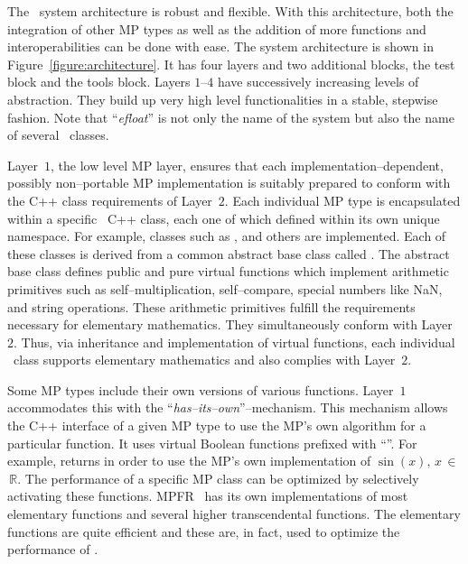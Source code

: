 The \efloat\ system architecture is robust and flexible.
With this architecture, both the integration of other MP types as well as
the addition of more functions and interoperabilities can be done with ease. 
The system architecture is shown in Figure~\ref{figure:architecture}.
It has four layers and two additional
blocks, the test block and the tools block. Layers $1$--$4$ have successively
increasing levels of abstraction. They build up very high level
functionalities in a stable, stepwise fashion.
Note that ``{\emph e}{\ttfamily{\underline\ }}{\emph{float}}''
is not only the name of the system but also the name of several
\efloatclass\ classes.

Layer~$1$, the low level MP layer, ensures that each
implementation--dependent, possibly non--portable MP implementation
is suitably prepared to conform with the C++ class requirements of Layer~$2$.
Each individual MP type is encapsulated within a specific
\efloatclass\ C++ class,
each one of which defined within its own unique name\-space.
For example, classes such as
{},
{} and others are implemented.
Each of these classes is derived from a common abstract
base class called {}.
The abstract base class defines public and pure virtual functions
which implement arithmetic primitives such as self--multiplication,
self--compare, special numbers like NaN, and string operations.
These arithmetic primitives fulfill the requirements necessary for
elementary mathematics. They simultaneously conform with Layer~$2$.
Thus, via inheritance and implementation of virtual functions,
each individual \efloatclass\
class supports elementary mathematics and also complies with Layer~$2$.

Some MP types include their own versions of various functions.
Layer~$1$ accommodates this with the
``{\emph{has--its--own}}''--mechanism. This mechanism allows the
C++ interface of a given MP type to use the MP's own
algorithm for a particular function.
It uses virtual Boolean functions prefixed with
``{}''.
For example,
{}
returns {\courier{true}} in order to use the MP's own implementation
of $\sin(x)$, $x$$\,\in$$\,\mathbb{R}$.
The performance of a specific MP class can be optimized
by selectively activating these functions.
MPFR~\cite{33:2:1} has its own implementations of most elementary functions
and several higher transcendental functions. The elementary functions
are quite efficient and these are, in fact, used to optimize the
performance of {\courier{mpfr::e{\ttfamily\underline\ }float}}.

